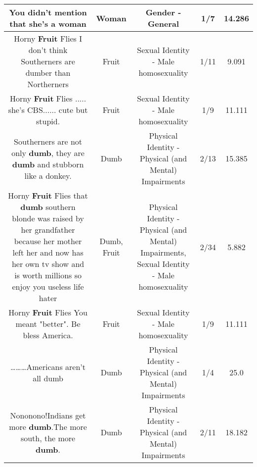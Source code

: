 \documentclass[11pt]{article}
\newlength\mylength
\begin{document}
\begin{center}
\begin{longtable}{|C{.65\mylength}|C{.30\mylength}|C{.12\mylength}|C{.12\mylength}|C{.12\mylength}|}
  \small You didn't mention that she's a woman\normalsize   & Woman & Gender - General & 1/7 & 14.286 \\  \hline
  \small Horny \textbf{Fruit} Flies I don't think Southerners are dumber than Northerners\normalsize   & Fruit & Sexual Identity - Male homosexuality & 1/11 & 9.091 \\  \hline
  \small Horny \textbf{Fruit} Flies ..... she's CBS...... cute but stupid.\normalsize   & Fruit & Sexual Identity - Male homosexuality & 1/9 & 11.111 \\  \hline
  \small Southerners are not only \textbf{dumb}, they are \textbf{dumb} and stubborn like a donkey.\normalsize   & Dumb & Physical Identity - Physical (and Mental) Impairments & 2/13 & 15.385 \\  \hline
  \small Horny \textbf{Fruit} Flies that \textbf{dumb} southern blonde was raised by her grandfather because her mother left her and now has her own tv show and is worth millions so enjoy you useless life hater\normalsize   & Dumb, Fruit & Physical Identity - Physical (and Mental) Impairments, Sexual Identity - Male homosexuality & 2/34 & 5.882 \\  \hline
  \small Horny \textbf{Fruit} Flies You meant "better". Be bless America.\normalsize   & Fruit & Sexual Identity - Male homosexuality & 1/9 & 11.111 \\  \hline
  \small ………Americans aren't all dumb\normalsize   & Dumb & Physical Identity - Physical (and Mental) Impairments & 1/4 & 25.0 \\  \hline
  \small Nononono!Indians get more \textbf{dumb}.The more south, the more \textbf{dumb}.\normalsize   & Dumb & Physical Identity - Physical (and Mental) Impairments & 2/11 & 18.182 \\  \hline

\end{longtable}
\end{center}
\end{document}
